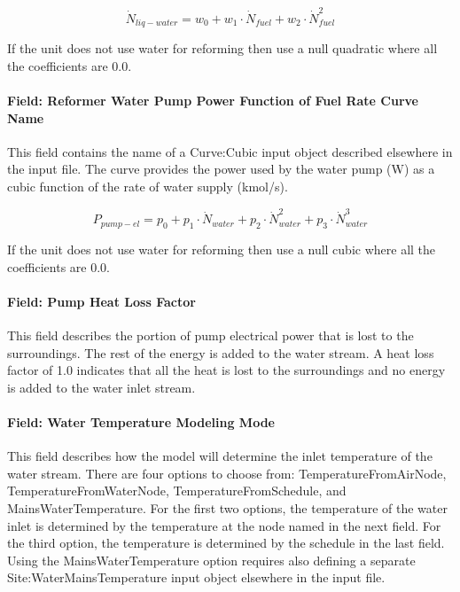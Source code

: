 \begin{equation}
{\dot N_{liq - water}} = {w_0} + {w_1} \cdot {\dot N_{fuel}} + {w_2} \cdot \dot N_{fuel}^2
\end{equation}

If the unit does not use water for reforming then use a null quadratic where all the coefficients are 0.0.

\paragraph{Field: Reformer Water Pump Power Function of Fuel Rate Curve Name}\label{field-reformer-water-pump-power-function-of-fuel-rate-curve-name}

This field contains the name of a Curve:Cubic input object described elsewhere in the input file. The curve provides the power used by the water pump (W) as a cubic function of the rate of water supply (kmol/s).

\begin{equation}
{P_{pump - el}} = {p_0} + {p_1} \cdot {\dot N_{water}} + {p_2} \cdot \dot N_{water}^2 + {p_3} \cdot \dot N_{water}^3
\end{equation}

If the unit does not use water for reforming then use a null cubic where all the coefficients are 0.0.

\paragraph{Field: Pump Heat Loss Factor}\label{field-pump-heat-loss-factor}

This field describes the portion of pump electrical power that is lost to the surroundings. The rest of the energy is added to the water stream. A heat loss factor of 1.0 indicates that all the heat is lost to the surroundings and no energy is added to the water inlet stream.

\paragraph{Field: Water Temperature Modeling Mode}\label{field-water-temperature-modeling-mode}

This field describes how the model will determine the inlet temperature of the water stream. There are four options to choose from: TemperatureFromAirNode, TemperatureFromWaterNode, TemperatureFromSchedule, and MainsWaterTemperature. For the first two options, the temperature of the water inlet is determined by the temperature at the node named in the next field. For the third option, the temperature is determined by the schedule in the last field. Using the MainsWaterTemperature option requires also defining a separate Site:WaterMainsTemperature input object elsewhere in the input file.


